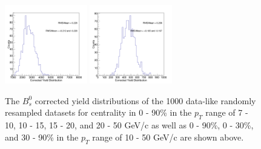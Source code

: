 \begin{figure}[h]
\begin{center}
\includegraphics[width= 0.32\textwidth]{Figures/Chapter4/BsCorrYield_0_30_10-50_Assym.png}
\includegraphics[width= 0.32\textwidth]{Figures/Chapter4/BsCorrYield_30_90_10-50_Assym.png}  
\caption{The $B^0_s$ corrected yield distributions of the 1000 data-like randomly resampled datasets for centrality in 0 - 90\% in the $p_T$ range of 7 - 10, 10 - 15, 15 - 20, and 20 - 50 GeV/c as well as 0 - 90\%, 0 - 30\%, and 30 - 90\% in the $p_T$ range of 10 - 50 GeV/c are shown above.} 
\label{BsCorrYieldBoot} 
\end{center}
\end{figure}
\clearpage

